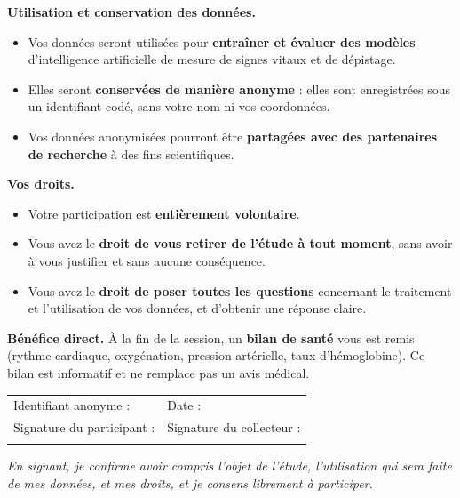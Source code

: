 \documentclass[11pt,a4paper]{article}
\begin{document}
\vspace{0.3cm}
\noindent\textbf{Utilisation et conservation des données.}
\begin{itemize}
\item Vos données seront utilisées pour \textbf{entraîner et évaluer des modèles}
d'intelligence artificielle de mesure de signes vitaux et de dépistage.
\item Elles seront \textbf{conservées de manière anonyme} : elles sont
enregistrées sous un identifiant codé, sans votre nom ni vos coordonnées.
\item Vos données anonymisées pourront être \textbf{partagées avec des
partenaires de recherche} à des fins scientifiques.
\end{itemize}

\vspace{0.3cm}
\noindent\textbf{Vos droits.}
\begin{itemize}
\item Votre participation est \textbf{entièrement volontaire}.
\item Vous avez le \textbf{droit de vous retirer de l'étude à tout moment}, sans
avoir à vous justifier et sans aucune conséquence.
\item Vous avez le \textbf{droit de poser toutes les questions} concernant le
traitement et l'utilisation de vos données, et d'obtenir une réponse claire.
\end{itemize}

\vspace{0.3cm}
\noindent\textbf{Bénéfice direct.}
À la fin de la session, un \textbf{bilan de santé} vous est remis (rythme
cardiaque, oxygénation, pression artérielle, taux d'hémoglobine). Ce bilan est
informatif et ne remplace pas un avis médical.

\vspace{0.6cm}
\noindent
\begin{tabularx}{\textwidth}{X X}
Identifiant anonyme : \underline{\hspace{3.5cm}} &
Date : \underline{\hspace{3.5cm}} \\[0.9cm]
Signature du participant : & Signature du collecteur : \\[1.0cm]
\underline{\hspace{6cm}} & \underline{\hspace{6cm}} \\
\end{tabularx}

\vspace{0.4cm}
\noindent\small
\textit{En signant, je confirme avoir compris l'objet de l'étude, l'utilisation
qui sera faite de mes données, et mes droits, et je consens librement à
participer.}
\end{document}
